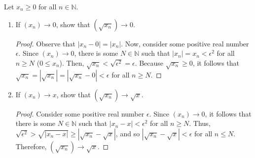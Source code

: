 \documentclass[12pt]{article}
\newcommand{\N}{\mathbb{N}}
\newcommand{\Abs}[1]{\left\vert #1 \right\vert}
\newenvironment{problem}[2][Problem]{\begin{trivlist} \item[\hskip \labelsep {\bfseries #1}\hskip \labelsep {\bfseries #2.}]}{\end{trivlist}}
\begin{document}
    \begin{problem}{2.3.1}
      Let $x_{n}\geq 0$ for all $n\in \N$.
      \begin{enumerate}[label=(\alph*)]
	\item If $(x_{n})\to 0$, show that $(\sqrt{x_{n}})\to0$.
    \begin{proof}
      Observe that $|x_{n}-0|=|x_{n}|$. Now, consider some positive real number $\epsilon$. Since $(x_{n})\to 0$, there is some $N\in \N$ such that $|x_{n}|=x_{n} < \epsilon^{2}$ for all $n\geq N$ ($0\leq x_{n}$). Then, $\sqrt{x_{n}} < \sqrt{\epsilon^{2}}=\epsilon$. Because $\sqrt{x_{n}}\geq 0$, it follows that $\sqrt{x_{n}}=\Abs{\sqrt{x_{n}}} = \Abs{\sqrt{x_{n}}-0}<\epsilon$ for all $n\geq N$. 
    \end{proof}
	\item If $(x_{n})\to x$, show that $(\sqrt{x_{n}})\to\sqrt{x}$.
    \begin{proof}
      Consider some positive real number $\epsilon$. Since $(x_{n}) \to 0$, it follows that there is some $N\in \N$ such that $|x_{n}-x| < \epsilon^{2}$ for all $n\geq N$. Thus, $\sqrt{\epsilon^{2}} > \sqrt{|x_{n}-x|} \geq |\sqrt{x_{n}}-\sqrt{x}|$, and so  $|\sqrt{x_{n}}-\sqrt{x}|<\epsilon$ for all $n\leq N$. Therefore, $(\sqrt{x_{n}})\to \sqrt{x}$.
    \end{proof}
    \end{enumerate}
    \end{problem}
\end{document}

